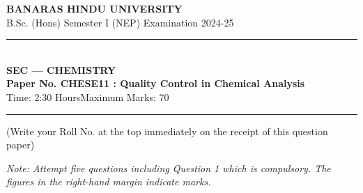 \documentclass[11pt,a4paper]{article}
\begin{document}
\begin{center}
  {\large\bfseries BANARAS HINDU UNIVERSITY}\\[2pt]
  {\normalsize B.Sc. (Hons) Semester I (NEP) Examination 2024-25}\\[6pt]
  \rule{0.8\linewidth}{0.5pt}\\[6pt]
  {\large\bfseries SEC --- CHEMISTRY}\\[4pt]
  {\large\bfseries Paper No. CHESE11 : Quality Control in Chemical Analysis}\\[4pt]
  {\normalsize Time: 2:30 Hours\hfill Maximum Marks: 70}
\end{center}

\rule{\linewidth}{0.4pt}

\smallskip



\noindent (Write your Roll No. at the top immediately on the receipt of this question paper)

\smallskip



\noindent   \textit{Note: Attempt five questions including Question 1 which is compulsory. The figures in the right-hand margin indicate marks.}

\bigskip
\end{document}
